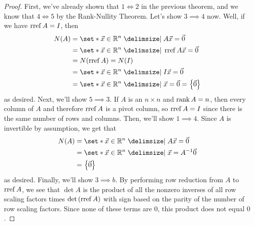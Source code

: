 \documentclass[main.tex]{subfiles}
\begin{document}
\begin{proof}
    First, we've already shown that $1 \iff 2$ in the previous theorem, and we know that $4 \iff 5$ by the Rank-Nullity Theorem. Let's show $3\implies 4$ now. Well, if we have $\operatorname{rref} A = I$, then 
    \begin{align*}
        N(A) &= \set*{\vx \in \RR^n \mid A\vx = \vec{0}} \\
        &= \set*{\vx \in \RR^n \mid \rref A\vx = \vec{0}} \\
        &= N(\rref A) = N(I) \\
        &= \set*{\vx \in \RR^n \mid I\vx = \vec{0}} \\
        &= \set*{\vx \in \RR^n \mid \vx = \vec{0}} = \braces{\vec{0}}
    \end{align*}
    as desired. Next, we'll show $5\implies 3$. If $A$ is an $n\times n$ and $\operatorname{rank} A = n$, then every column of $A$ and therefore $\operatorname{rref} A$ is a pivot column, so $\operatorname{rref} A = I$ since there is the same number of rows and columns. Then, we'll show $1\implies 4$. Since $A$ is invertible by assumption, we get that
    \begin{align*}
        N(A) &= \set*{\vx\in \RR^n \mid A\vx = \vec{0}} \\
        &= \set*{\vx\in \RR^n \mid \vx = A^{-1}\vec{0}} \\
        &= \braces{\vec{0}}
    \end{align*}
    as desired. Finally, we'll show $3\implies b$. By performing row reduction from $A$ to $\operatorname{rref} A$, we see that $\det A$ is the product of all the nonzero inverses of all row scaling factors times $\det \left( \operatorname{rref} A \right)$ with sign based on the parity of the number of row scaling factors. Since none of these terms are $0$, this product does not equal $0$.
\end{proof}
\end{document}
